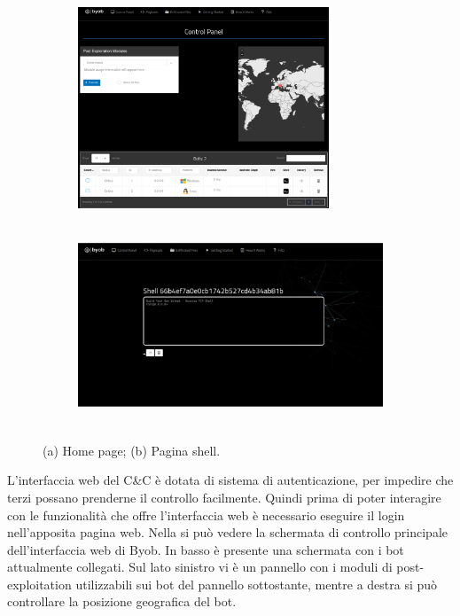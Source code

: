 \begin{figure}[hbtp]
    \centering
    \begin{subfigure}[hbtp]{0.45\textwidth}
        \centering
        \includegraphics[width=\textwidth, height=6cm]{res/fig/byob-home.png}
        \caption{}
        \label{fig:byobhome}
    \end{subfigure}
    \hfill
    \begin{subfigure}[hbtp]{0.45\textwidth}
        \centering
        \includegraphics[width=\textwidth , height=6cm]{res/fig/byob-shell.png}
        \caption{}
        \label{fig:byobshell}
    \end{subfigure}
    \caption{(a) Home page; (b) Pagina shell.}
    \label{ciao1}
\end{figure}

L'interfaccia web del C\&C è  dotata di sistema di autenticazione, per impedire che terzi possano prenderne il controllo facilmente. Quindi prima di poter interagire con le funzionalità che offre l'interfaccia web è necessario eseguire il login nell'apposita pagina web.
Nella   si può vedere la schermata di controllo principale dell'interfaccia web di Byob. In basso è presente una schermata con i bot attualmente collegati. Sul lato  sinistro vi è  un pannello con i moduli di post-exploitation utilizzabili sui bot del pannello sottostante, mentre a destra si può controllare la posizione geografica del bot. 

